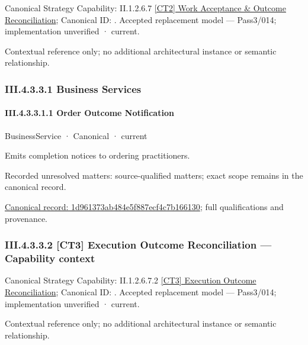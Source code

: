 {\small Canonical Strategy Capability: II.1.2.6.7 \hyperref[element:64615db0fc2a4198a06d7e08cd0990c0]{[CT2] Work Acceptance \& Outcome Reconciliation}; Canonical ID: \texttt{}. Accepted replacement model — Pass3/014; implementation unverified · current.}\par
Contextual reference only; no additional architectural instance or semantic relationship.\par
\subsubsection*{III.4.3.3.1 Business Services}
\label{navigation:III.4.3.3.1}

\paragraph*{III.4.3.3.1.1 Order Outcome Notification}
\label{navigation:III.4.3.3.1.1}

\label{element:1d961373ab484e5f887ecf4c7b166130}
{\small BusinessService · Canonical · current}\par

Emits completion notices to ordering practitioners.


{\small Recorded unresolved matters: source-qualified matters; exact scope remains in the canonical record.}\par
{\footnotesize \href{../../../../continuum/business/business-service/1d961373ab484e5f887ecf4c7b166130.md}{Canonical record: 1d961373ab484e5f887ecf4c7b166130}; full qualifications and provenance.}\par
\subsubsection*{III.4.3.3.2 [CT3] Execution Outcome Reconciliation — Capability context}
\label{navigation:III.4.3.3.2}

{\small Canonical Strategy Capability: II.1.2.6.7.2 \hyperref[element:383de8b703bb448b96cf2ac9c31c90c5]{[CT3] Execution Outcome Reconciliation}; Canonical ID: \texttt{}. Accepted replacement model — Pass3/014; implementation unverified · current.}\par
Contextual reference only; no additional architectural instance or semantic relationship.\par
